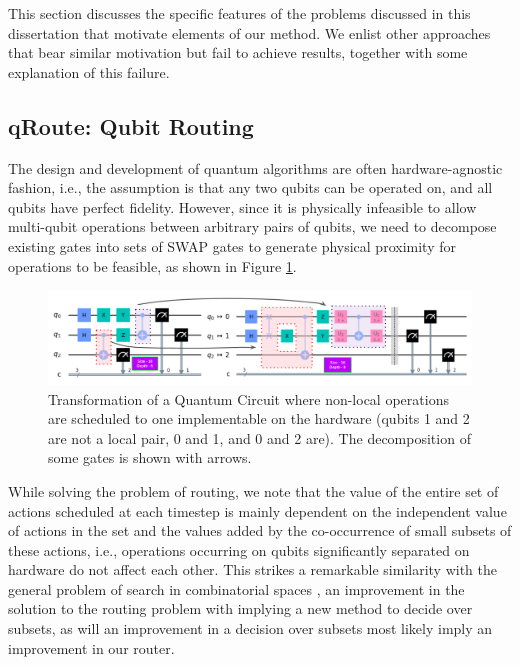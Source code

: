 This section discusses the specific features of the problems discussed in this dissertation that motivate elements of our method. We enlist other approaches that bear similar motivation but fail to achieve results, together with some explanation of this failure.

\subsection{qRoute: Qubit Routing}

The design and development of quantum algorithms are often hardware-agnostic fashion, i.e., the assumption is that any two qubits can be operated on, and all qubits have perfect fidelity. However, since it is physically infeasible to allow multi-qubit operations between arbitrary pairs of qubits, we need to decompose existing gates into sets of SWAP gates to generate physical proximity for operations to be feasible, as shown in Figure \ref{fig:intro-qubit-routing-example}. 

\begin{figure}[ht]
    \centering
    \includegraphics[width=\linewidth]{figures/intro/routing-transform.png}
    \caption[Example of the Qubit Routing task]{Transformation of a Quantum Circuit where non-local operations are scheduled to one implementable on the hardware (qubits 1 and 2 are not a local pair, 0 and 1, and 0 and 2 are). The decomposition of some gates is shown with arrows.}
    \label{fig:intro-qubit-routing-example}
\end{figure}

While solving the problem of routing, we note that the value of the entire set of actions scheduled at each timestep is mainly dependent on the independent value of actions in the set and the values added by the co-occurrence of small subsets of these actions, i.e., operations occurring on qubits significantly separated on hardware do not affect each other. This strikes a remarkable similarity with the general problem of search in combinatorial spaces \cite{qroute_dqn1}, an improvement in the solution to the routing problem with implying a new method to decide over subsets, as will an improvement in a decision over subsets most likely imply an improvement in our router.

